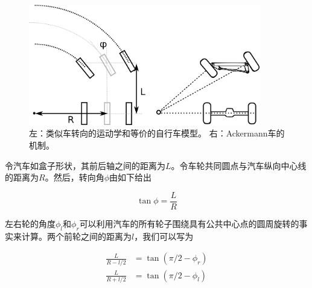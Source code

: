 \begin{figure}[htb!]
	\centering
		\includegraphics[width=0.9\textwidth]{figs/ackermann.png}
	\caption {左：类似车转向的运动学和等价的自行车模型。 右：Ackermann车的机制。}
	\label{fig:ackermann}
\end{figure}


令汽车如盒子形状，其前后轴之间的距离为$L$。令车轮共同圆点与汽车纵向中心线的距离为$R$。然后，转向角$\phi$由如下给出

\begin{equation}\label{eq:ackermann}
\tan \phi = \frac{L}{R}
\end{equation}


左右轮的角度$\phi_l$和$\phi_r$可以利用汽车的所有轮子围绕具有公共中心点的圆周旋转的事实来计算。两个前轮之间的距离为$l$，我们可以写为

\begin{eqnarray}
\frac{L}{R-l/2}&=\tan{(\pi/2-\phi_r)}\\
\frac{L}{R+l/2}&=\tan{(\pi/2-\phi_l)}
\end{eqnarray}

